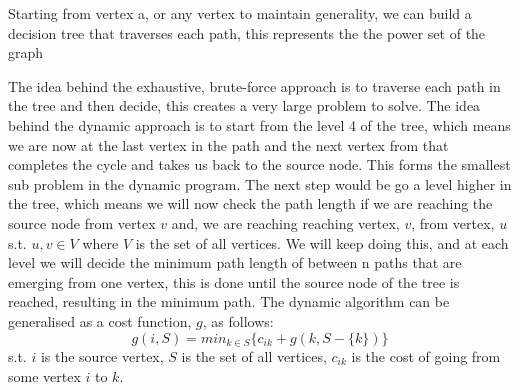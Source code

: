 \documentclass[12pt]{report}
\begin{document}
Starting from vertex a, or any vertex to maintain generality, we can build a decision tree that traverses each path, this represents the the power set of the graph
  \begin{center}
  \end{center}
The idea behind the exhaustive, brute-force approach is to traverse each path in the tree and then decide, this creates a very large problem to solve. The idea behind the dynamic approach is to start from the level 4 of the tree, which means we are now at the last vertex in the path and the next vertex from that completes the cycle and takes us back to the source node. This forms the smallest sub problem in the dynamic program. The next step would be go a level higher in the tree, which means we will now check the path length if we are reaching the source node from vertex $v$ and, we are reaching reaching vertex, $v$, from vertex, $u$ s.t. $u,v \in V$ where $V$ is the set of all vertices. We will keep doing this, and at each level we will decide the minimum path length of between n paths that are emerging from one vertex, this is done until the source node of the tree is reached, resulting in the minimum path. The dynamic algorithm can be generalised as a cost function, $g$, as follows:
$$g(i, S) = min_{k\in S} \bigg\{c_{ik} + g(k, S-\{k\})\bigg\}$$
s.t. $i$ is the source vertex, $S$ is the set of all vertices, $c_{ik}$ is the cost of going from some vertex $i$ to $k$. 
\end{document}
